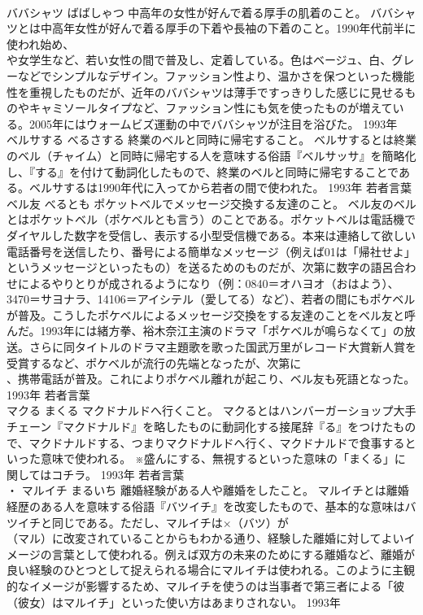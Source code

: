\documentclass[8pt]{extreport}
\begin{document}
\begin{CJK}{UTF8}{min}
\\	ババシャツ	ばばしゃつ	中高年の女性が好んで着る厚手の肌着のこと。	ババシャツとは中高年女性が好んで着る厚手の下着や長袖の下着のこと。1990年代前半に使われ始め、
\\	や女学生など、若い女性の間で普及し、定着している。色はベージュ、白、グレーなどでシンプルなデザイン。ファッション性より、温かさを保つといった機能性を重視したものだが、近年のババシャツは薄手ですっきりした感じに見せるものやキャミソールタイプなど、ファッション性にも気を使ったものが増えている。2005年にはウォームビズ運動の中でババシャツが注目を浴びた。	1993年	
\\	ベルサする	べるさする	終業のベルと同時に帰宅すること。	ベルサするとは終業のベル（チャイム）と同時に帰宅する人を意味する俗語『ベルサッサ』を簡略化し、『する』を付けて動詞化したもので、終業のベルと同時に帰宅することである。ベルサするは1990年代に入ってから若者の間で使われた。	1993年	若者言葉	
\\	ベル友	べるとも	ポケットベルでメッセージ交換する友達のこと。	ベル友のベルとはポケットベル（ポケベルとも言う）のことである。ポケットベルは電話機でダイヤルした数字を受信し、表示する小型受信機である。本来は連絡して欲しい電話番号を送信したり、番号による簡単なメッセージ（例えば01は「帰社せよ」というメッセージといったもの）を送るためのものだが、次第に数字の語呂合わせによるやりとりが成されるようになり（例：0840＝オハヨオ（おはよう）、3470＝サヨナラ、14106＝アイシテル（愛してる）など）、若者の間にもポケベルが普及。こうしたポケベルによるメッセージ交換をする友達のことをベル友と呼んだ。1993年には緒方拳、裕木奈江主演のドラマ「ポケベルが鳴らなくて」の放送。さらに同タイトルのドラマ主題歌を歌った国武万里がレコード大賞新人賞を受賞するなど、ポケベルが流行の先端となったが、次第に
\\	、携帯電話が普及。これによりポケベル離れが起こり、ベル友も死語となった。	1993年	若者言葉	
\\	マクる	まくる	マクドナルドへ行くこと。	マクるとはハンバーガーショップ大手チェーン『マクドナルド』を略したものに動詞化する接尾辞『る』をつけたもので、マクドナルドする、つまりマクドナルドへ行く、マクドナルドで食事するといった意味で使われる。 ※盛んにする、無視するといった意味の「まくる」に関してはコチラ。	1993年	若者言葉	
\\	・ マルイチ	まるいち	離婚経験がある人や離婚をしたこと。	マルイチとは離婚経歴のある人を意味する俗語『バツイチ』を改変したもので、基本的な意味はバツイチと同じである。ただし、マルイチは×（バツ）が
\\	（マル）に改変されていることからもわかる通り、経験した離婚に対してよいイメージの言葉として使われる。例えば双方の未来のためにする離婚など、離婚が良い経験のひとつとして捉えられる場合にマルイチは使われる。このように主観的なイメージが影響するため、マルイチを使うのは当事者で第三者による「彼（彼女）はマルイチ」といった使い方はあまりされない。	1993年	

\end{CJK}
\end{document}
